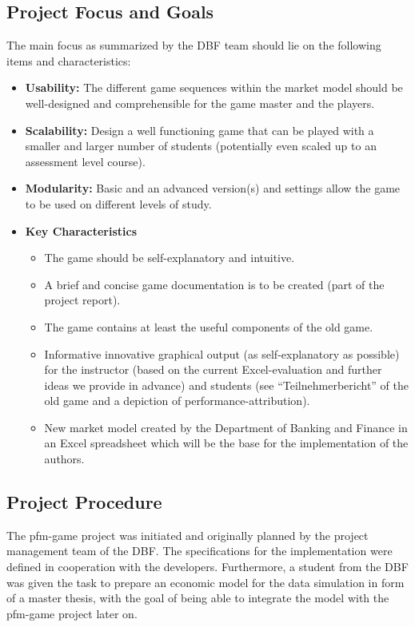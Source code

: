 \subsection{Project Focus and Goals}
The main focus as summarized by the DBF team should lie on the following items and characteristics:
\begin{itemize}
  \item \textbf{Usability:} The different game sequences within the market model should be well-designed and comprehensible for the game master and the players.
  \item \textbf{Scalability:} Design a well functioning game that can be played with a smaller and larger number of students (potentially even scaled up to an assessment level course).
  \item \textbf{Modularity:} Basic and an advanced version(s) and settings allow the game to be used on different levels of study.
  \item \textbf{Key Characteristics}
  \begin{itemize}
    \item The game should be self-explanatory and intuitive.
    \item A brief and concise game documentation is to be created (part of the project report).
    \item The game contains at least the useful components of the old game.
    \item Informative innovative graphical output (as self-explanatory as possible) for the instructor (based on the current Excel-evaluation and further ideas we provide in advance) and students (see ``Teilnehmerbericht'' of the old game and a depiction of performance-attribution).
    \item New market model created by the Department of Banking and Finance in an Excel spreadsheet which will be the base for the implementation of the authors.
  \end{itemize}
\end{itemize}



\subsection{Project Procedure}
The pfm-game project was initiated and originally planned by the project management team of the DBF. The specifications for the implementation were defined in cooperation with the developers. Furthermore, a student from the DBF was given the task to prepare an economic model for the data simulation in form of a master thesis, with the goal of being able to integrate the model with the pfm-game project later on.\\

